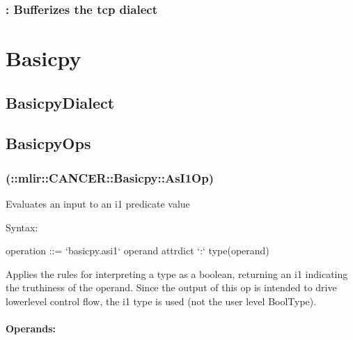 \documentclass[letterpaper,10pt,english]{sphinxmanual}
\begin{document}
\subsection{: Bufferizes the tcp dialect}
\label{\detokenize{Pass_And_Transforms/index:tcp-bufferize-bufferizes-the-tcp-dialect}}

\chapter{Basicpy}
\label{\detokenize{Basicpy/index:basicpy}}\label{\detokenize{Basicpy/index::doc}}

\section{BasicpyDialect}
\label{\detokenize{Basicpy/index:basicpydialect}}



\section{BasicpyOps}
\label{\detokenize{Basicpy/index:basicpyops}}



\subsection{ (::mlir::CANCER::Basicpy::AsI1Op)}
\label{\detokenize{Basicpy/index:basicpy-as-i1-mlir-cancer-basicpy-asi1op}}
\sphinxAtStartPar
Evaluates an input to an i1 predicate value

\sphinxAtStartPar
Syntax:

\begin{sphinxVerbatim}[commandchars=\\\{\}]
operation ::= `basicpy.as\PYGZus{}i1` \PYGZdl{}operand attr\PYGZhy{}dict `:` type(\PYGZdl{}operand)
\end{sphinxVerbatim}

\sphinxAtStartPar
Applies the rules for interpreting a type as a boolean, returning an i1
indicating the truthiness of the operand. Since the output of this op is
intended to drive lower\sphinxhyphen{}level control flow, the i1 type is used (not the
user level BoolType).


\subsubsection{Operands:}
\label{\detokenize{Basicpy/index:operands}}
\end{document}
